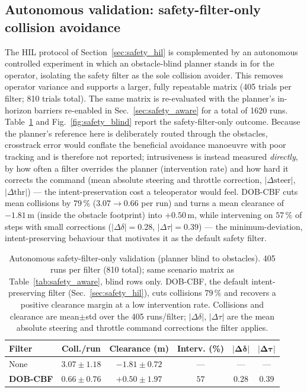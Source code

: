 \documentclass[conference,letterpaper,10pt]{IEEEtran}
\begin{document}
\subsection{Autonomous validation: safety-filter-only collision avoidance}
\label{sec:safety_blind}

The HIL protocol of Section~\ref{sec:safety_hil} is complemented by
an autonomous controlled experiment in which an obstacle-blind planner
stands in for the operator, isolating the safety filter as the sole collision
avoider. This
removes operator variance and supports a larger, fully repeatable
matrix (405 trials per filter; 810 trials total). The same matrix is
re-evaluated with the planner's in-horizon barriers re-enabled in
Sec.~\ref{sec:safety_aware} for a total of 1620 runs.
Table~\ref{tab:safety_blind} and Fig.~\ref{fig:safety_blind} report the
safety-filter-only outcome. Because the planner's reference here is
deliberately routed through the obstacles, crosstrack error would conflate
the beneficial avoidance manoeuvre with poor tracking and is therefore not
reported; intrusiveness is instead measured \emph{directly}, by how often a
filter overrides the planner (intervention rate) and how hard it corrects
the command (mean absolute steering and throttle correction,
$|\Delta\mathrm{steer}|$, $|\Delta\mathrm{thr}|$) --- the intent-preservation
cost a teleoperator would feel. DOB-CBF cuts mean collisions by $79\,\%$
($3.07\!\to\!0.66$ per run) and turns a mean clearance of $-1.81\,$m (inside
the obstacle footprint) into $+0.50\,$m, while intervening on $57\,\%$ of
steps with small corrections ($|\Delta\delta|\!=\!0.28$,
$|\Delta\tau|\!=\!0.39$) --- the minimum-deviation, intent-preserving
behaviour that motivates it as the default safety filter.

\begin{table}[!t]
  \renewcommand{\arraystretch}{1.10}
  \caption{Autonomous safety-filter-only validation (planner blind to
    obstacles). 405 runs per filter (810 total); same scenario matrix
    as Table~\ref{tab:safety_aware}, blind rows only. DOB-CBF, the default
    intent-preserving filter (Sec.~\ref{sec:safety_hil}), cuts collisions
    $79\,\%$ and recovers a positive clearance margin at a low intervention
    rate. Collisions and clearance are mean$\pm$std over the 405 runs/filter;
    $|\Delta\delta|$, $|\Delta\tau|$ are the mean absolute steering and
    throttle command corrections the filter applies.}
  \label{tab:safety_blind}
  \centering
  \setlength{\tabcolsep}{3pt}
  \footnotesize
  \begin{tabular}{lccccc}
    \toprule
    \textbf{Filter} & \textbf{Coll./run} & \textbf{Clearance (m)} & \textbf{Interv. (\%)} & $\mathbf{|\Delta\delta|}$ & $\mathbf{|\Delta\tau|}$\\
    \midrule
    None         & $3.07\!\pm\!1.18$ & $-1.81\!\pm\!0.72$ & --- & --- & ---\\
    \textbf{DOB-CBF} & $\mathbf{0.66\!\pm\!0.76}$ & $\mathbf{+0.50\!\pm\!1.97}$ & $57$ & $0.28$ & $0.39$\\
    \bottomrule
  \end{tabular}
\end{table}
\end{document}
